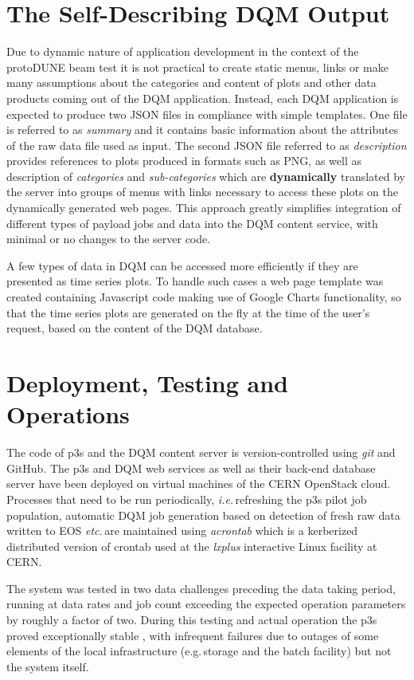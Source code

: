 \documentclass[pdftex,12pt,letter]{article}
\newcommand{\pd}{protoDUNE\xspace}
\begin{document}
\section{The Self-Describing DQM Output}

Due to dynamic nature of application development in the context of the \pd beam
test it is not practical to create static menus, links or make many assumptions about
the categories and content of plots and other data products coming out of the DQM
application. Instead,
each DQM application is expected to produce two JSON files in compliance
with simple templates. One file is referred to as \textit{summary} and it contains basic
information about the attributes of the raw data file used as input. The second JSON file
referred to as \textit{description} provides references to plots produced in formats such
as PNG, as well as description of \textit{categories} and \textit{sub-categories} which
are \textbf{dynamically} translated by the server into
groups of menus with links necessary to access these plots on the dynamically generated
web pages. This approach greatly simplifies integration of different types of payload jobs 
and data into the DQM content service, with minimal or no changes to the
server code.


A few types of data in DQM can be accessed more efficiently if they are presented as time
series plots. To handle such cases a web page template was created containing
Javascript code making use of Google Charts functionality, so that the time series
plots are generated on the fly at the time of the user's request, based on the content
of the DQM database.

\section{Deployment, Testing and Operations}

The code of p3s and the DQM content server is version-controlled using \textit{git}
and GitHub. The p3s and DQM web services as well as their back-end database server have been deployed on
virtual machines of the CERN OpenStack cloud. Processes that need to be run periodically,
\textit{i.e.}\,refreshing the p3s pilot job population, automatic DQM job generation based on detection
of fresh raw data written to EOS \textit{etc.}\,are maintained using \textit{acrontab} which is a kerberized
distributed version of crontab used at the \textit{lxplus} interactive Linux facility at CERN.

The system was tested in two data challenges preceding the data taking period, running
at data rates and job count exceeding the expected operation parameters by roughly
a factor of two. During this testing and actual operation the p3s proved exceptionally stable \cite{chep18},
with infrequent failures due to outages of some elements of the local infrastructure
(e.g.\,storage and the batch facility) but not the system itself.
\end{document}
